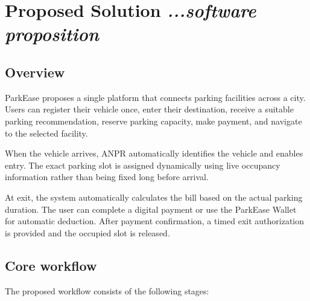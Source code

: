 \documentclass[12pt,a4paper]{article}
\begin{document}

\section{\textbf{Proposed Solution}
\hfill
{\small\mdseries\itshape ...software proposition}}

\subsection{Overview}

ParkEase proposes a single platform that connects parking facilities across a city. Users can register their vehicle once, enter their destination, receive a suitable parking recommendation, reserve parking capacity, make payment, and navigate to the selected facility.

When the vehicle arrives, ANPR automatically identifies the vehicle and enables entry. The exact parking slot is assigned dynamically using live occupancy information rather than being fixed long before arrival.

At exit, the system automatically calculates the bill based on the actual parking duration. The user can complete a digital payment or use the ParkEase Wallet for automatic deduction. After payment confirmation, a timed exit authorization is provided and the occupied slot is released.

\subsection{Core workflow}

The proposed workflow consists of the following stages:
\end{document}
